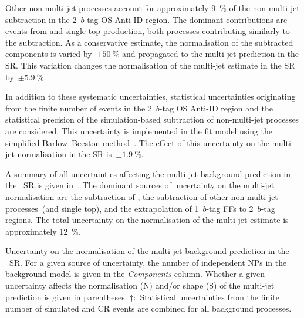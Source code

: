 Other non-multi-jet processes account for approximately \SI{9}{\percent} of the
non-multi-jet subtraction in the 2~$b$-tag OS Anti-ID region. The dominant
contributions are events from \Vjets and single top production, both processes
contributing similarly to the subtraction. As a conservative estimate, the
normalisation of the subtracted components is varied by~$\pm \SI{50}{\percent}$
and propagated to the multi-jet prediction in the SR. This variation changes the
normalisation of the multi-jet estimate in the SR by~$\pm\SI{5.9}{\percent}$.

In addition to these systematic uncertainties, statistical uncertainties
originating from the finite number of events in the 2~$b$-tag OS Anti-ID region
and the statistical precision of the simulation-based subtraction of
non-multi-jet processes are considered. This uncertainty is implemented in the
fit model using the simplified Barlow--Beeston
method~\cite{barlow1993,conway2011}. The effect of this uncertainty on the
multi-jet normalisation in the SR is~$\pm \SI{1.9}{\percent}$.

A summary of all uncertainties affecting the multi-jet background prediction in
the \hadhad~SR is given in~. The dominant
sources of uncertainty on the multi-jet normalisation are the subtraction of
\ttbarFakes, the subtraction of other non-multi-jet processes~(\Vjets and single
top), and the extrapolation of 1~$b$-tag FFs to 2~$b$-tag regions. The total
uncertainty on the normalisation of the multi-jet estimate is approximately
\SI{12}{\percent}.

\begin{table}[htbp]
  \centering

  \caption[Uncertainty on the normalisation of the multi-jet background
  prediction in the \hadhad~SR.]{Uncertainty on the normalisation of the
    multi-jet background prediction in the \hadhad~SR. For a given source of
    uncertainty, the number of independent NPs in the background model is given
    in the \emph{Components} column. Whether a given uncertainty affects the
    normalisation (N) and/or shape (S) of the multi-jet prediction is given in
    parentheses.  $\dagger$:~Statistical uncertainties from the finite number of
    simulated and CR events are combined for all background processes.}%
  \label{tab:multi_jet_uncertainties}

  
\end{table}



